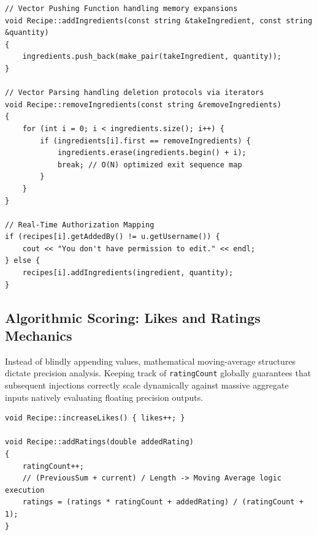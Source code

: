 \documentclass[12pt, a4paper]{article}
\begin{document}
\begin{lstlisting}[caption={Mutable Interface Authorization Framework}]
// Vector Pushing Function handling memory expansions
void Recipe::addIngredients(const string &takeIngredient, const string &quantity) 
{
    ingredients.push_back(make_pair(takeIngredient, quantity));
}

// Vector Parsing handling deletion protocols via iterators 
void Recipe::removeIngredients(const string &removeIngredients) 
{
    for (int i = 0; i < ingredients.size(); i++) {
        if (ingredients[i].first == removeIngredients) {
            ingredients.erase(ingredients.begin() + i);
            break; // O(N) optimized exit sequence map
        }
    }
}

// Real-Time Authorization Mapping
if (recipes[i].getAddedBy() != u.getUsername()) {
    cout << "You don't have permission to edit." << endl;
} else {
    recipes[i].addIngredients(ingredient, quantity);
}
\end{lstlisting}

\subsection{Algorithmic Scoring: Likes and Ratings Mechanics}
Instead of blindly appending values, mathematical moving-average structures dictate precision analysis. Keeping track of \texttt{ratingCount} globally guarantees that subsequent injections correctly scale dynamically against massive aggregate inputs natively evaluating floating precision outputs.
\begin{lstlisting}[caption={Mathematical Data Formulating Constraints}]
void Recipe::increaseLikes() { likes++; }

void Recipe::addRatings(double addedRating)
{
    ratingCount++;
    // (PreviousSum + current) / Length -> Moving Average logic execution
    ratings = (ratings * ratingCount + addedRating) / (ratingCount + 1); 
}
\end{lstlisting}
\end{document}
